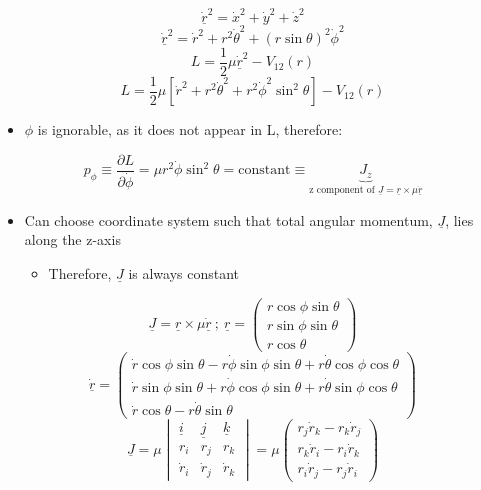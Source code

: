 \documentclass[a4paper,11pt,normalem]{article}
\begin{document}
\[
    \underline{\dot{r}}^2 = \dot{x}^2 + \dot{y}^2 + \dot{z}^2 \] \[
    \underline{\dot{r}}^2 = \dot{r}^2 + r^2\dot{\theta}^2 + (r\sin\theta)^2\dot{\phi}^2
\] \[
    L = \frac{1}{2}\mu \underline{\dot{r}}^2 - V_{12}(r) \] \[
    L = \frac{1}{2}\mu [\dot{r}^2 + r^2 \dot{\theta}^2 + r^2 \dot{\phi}^2\sin^2\theta] - V_{12}(r)
\]

\begin{itemize}
\item
  \(\phi\) is ignorable, as it does not appear in L, therefore:
\end{itemize}

\[
    p_{\phi} \equiv \frac{\partial L}{\partial \dot{\phi}} = \mu r^2\dot{\phi}\sin^2\theta = \text{constant} \equiv \underbrace{J_z}_{\text{z component of } \underline{J} = \underline{r} \times \mu\dot{\underline{r}}}
\]

\begin{itemize}
\item
  Can choose coordinate system such that total angular momentum,
  \(\underline{J}\), lies along the z-axis
  \begin{itemize}
  \item
    Therefore, \(\underline{J}\) is always constant
  \end{itemize}
\end{itemize}

\[
    \underline{J} = \underline{r} \times \mu\underline{\dot{r}} ~;~ \underline{r} = \begin{pmatrix} r\cos\phi\sin\theta \\ r\sin\phi\sin\theta \\ r\cos\theta \end{pmatrix} \]
\[
    \underline{\dot{r}} = \begin{pmatrix} \dot{r}\cos\phi\sin\theta - r\dot{\phi}\sin\phi\sin\theta + r\dot{\theta}\cos\phi\cos\theta \\ \dot{r}\sin\phi\sin\theta + r\dot{\phi}\cos\phi\sin\theta + r\dot{\theta}\sin\phi\cos{\theta} \\ \dot{r}\cos\theta - r\dot{\theta}\sin\theta \end{pmatrix} \]
\[
    \underline{J} = \mu \begin{vmatrix} \underline{i} & \underline{j} & \underline{k} \\ r_i & r_j & r_k \\ \dot{r}_i & \dot{r}_j & \dot{r}_k \end{vmatrix} = \mu \begin{pmatrix} r_j \dot{r}_k - r_k\dot{r}_j \\ r_k\dot{r}_i - r_i\dot{r}_k \\ r_i\dot{r}_j - r_j\dot{r}_i \end{pmatrix}
\]
\end{document}
